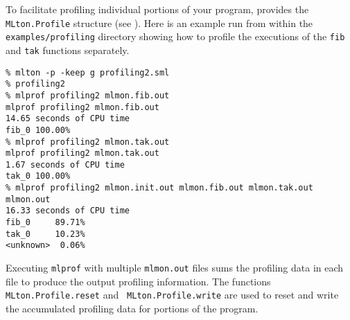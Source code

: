 To facilitate profiling individual portions of your program, {\mlton}
provides the {\tt MLton.Profile} structure (see ).
Here is an example run from within the {\tt examples/profiling}
directory showing how to profile the executions of the {\tt fib} and
{\tt tak} functions separately.

\begin{verbatim}
% mlton -p -keep g profiling2.sml
% profiling2
% mlprof profiling2 mlmon.fib.out
mlprof profiling2 mlmon.fib.out
14.65 seconds of CPU time
fib_0 100.00%
% mlprof profiling2 mlmon.tak.out
mlprof profiling2 mlmon.tak.out
1.67 seconds of CPU time
tak_0 100.00%
% mlprof profiling2 mlmon.init.out mlmon.fib.out mlmon.tak.out mlmon.out
16.33 seconds of CPU time
fib_0     89.71%
tak_0     10.23%
<unknown>  0.06%
\end{verbatim}

Executing {\tt mlprof} with multiple {\tt mlmon.out} files sums the
profiling data in each file to produce the output profiling
information.  The functions {\tt MLton.Profile.reset} and {\tt
  MLton.Profile.write} are used to reset and write the accumulated
profiling data for portions of the program.


